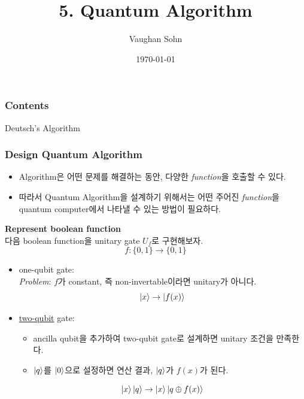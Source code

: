 \documentclass[9pt]{beamer}
\title{5. Quantum Algorithm}
\date{\today}
\author{Vaughan Sohn}
\begin{document}
    \maketitle
    
    \begin{frame}
        \frametitle{Contents}
        \tableofcontents
    \end{frame}
    
    \begin{section}{Deutsch's Algorithm}
        \begin{frame}
            \frametitle{Design Quantum Algorithm}
            \begin{itemize}
                \item Algorithm은 어떤 문제를 해결하는 동안, 다양한 \textit{function}을 호출할 수 있다.
                \item 따라서 Quantum Algorithm을 설계하기 위해서는 어떤 주어진 \textit{function}을 quantum computer에서 나타낼 수 있는 방법이 필요하다.
            \end{itemize}
            \vspace{0.3cm}
            \textbf{Represent boolean function}
            \\ 다음 boolean function을 unitary gate $U_f$로 구현해보자.
            $$ f: \{0, 1\} \rightarrow \{0, 1\} $$ 
            \vspace{-0.2cm}
            \begin{itemize}
                \item one-qubit gate: 
                \\\textit{Problem}: $f$가 constant, 즉 non-invertable이라면 unitary가 아니다.
                $$ \ket x \rightarrow \ket{f(x)} $$
                \item \underline{two-qubit} gate:
                \begin{itemize}
                    \item ancilla qubit을 추가하여 two-qubit gate로 설계하면 unitary 조건을 만족한다.
                    \item $\ket q$를 $\ket 0$으로 설정하면 연산 결과, $\ket q$가 $f(x)$가 된다.
                \end{itemize}
                $$\ket x \ket q \rightarrow \ket x \ket{q \oplus f(x)}$$
            \end{itemize}
        \end{frame}


\end{section}
\end{document}
